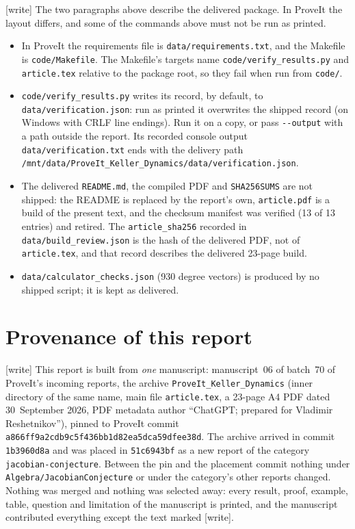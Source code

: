 \documentclass[11pt,a4paper]{article}
\numberwithin{equation}{section}
\theoremstyle{definition}
\theoremstyle{remark}
\newcommand{\wtag}{\textup{[write]}}%
\begin{document}
\noindent\wtag{} The two paragraphs above describe the delivered
package. In ProveIt the layout differs, and some of the commands above
must not be run as printed.
\begin{itemize}
\item In ProveIt the requirements file is
\texttt{data/requirements.txt}, and the Makefile is
\texttt{code/Makefile}. The Makefile's
targets name \texttt{code/verify\_results.py} and \texttt{article.tex}
relative to the package root, so they fail when run from
\texttt{code/}.
\item \texttt{code/verify\_results.py} writes its record, by default, to
\texttt{data/verification.json}: run as printed it overwrites the shipped
record (on Windows with CRLF line endings). Run it on a copy, or pass
\texttt{-{}-output} with a path outside the report. Its recorded console
output \texttt{data/verification.txt} ends with the delivery path
\nolinkurl{/mnt/data/ProveIt_Keller_Dynamics/data/verification.json}.
\item The delivered \texttt{README.md}, the compiled PDF and
\texttt{SHA256SUMS} are not shipped: the README is replaced by the
report's own, \texttt{article.pdf} is a build of the present text, and
the checksum manifest was verified (13 of 13 entries) and retired. The
\texttt{article\_sha256} recorded in \texttt{data/build\_review.json}
is the hash of the delivered PDF, not of \texttt{article.tex}, and that
record describes the delivered 23-page build.
\item \texttt{data/calculator\_checks.json} (930 degree vectors) is
produced by no shipped script; it is kept as delivered.
\end{itemize}

\section{Provenance of this report}\label{kmd:app:provenance}
\wtag{} This report is built from \emph{one} manuscript: manuscript~06
of batch~70 of ProveIt's incoming reports, the archive
\texttt{ProveIt\_Keller\_Dynamics} (inner directory of the same name,
main file \texttt{article.tex}, a 23-page A4 PDF dated 30~September
2026, PDF metadata author ``ChatGPT; prepared for Vladimir
Reshetnikov''), pinned to ProveIt commit
\nolinkurl{a866ff9a2cdb9c5f436bb1d82ea5dca59dfee38d}. The archive
arrived in commit \texttt{1b3960d8a} and was placed in
\texttt{51c6943bf} as a new report of the category
\texttt{jacobian-conjecture}. Between the pin and the placement commit
nothing under \texttt{Algebra/JacobianConjecture} or under the
category's other reports changed. Nothing was merged and nothing was
selected away: every result, proof, example, table, question and
limitation of the manuscript is printed, and the manuscript contributed
everything except the text marked \wtag.
\end{document}
